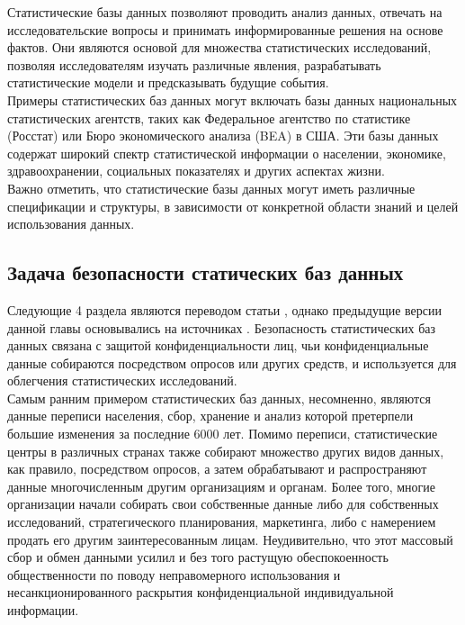Статистические базы данных позволяют проводить анализ данных, отвечать на исследовательские вопросы и принимать информированные решения на основе фактов. Они являются основой для множества статистических исследований, позволяя исследователям изучать различные явления, разрабатывать статистические модели и предсказывать будущие события.
\\

Примеры статистических баз данных могут включать базы данных национальных статистических агентств, таких как Федеральное агентство по статистике (Росстат) или Бюро экономического анализа (BEA) в США. Эти базы данных содержат широкий спектр статистической информации о населении, экономике, здравоохранении, социальных показателях и других аспектах жизни.
\\

Важно отметить, что статистические базы данных могут иметь различные спецификации и структуры, в зависимости от конкретной области знаний и целей использования данных.

\subsection{Задача безопасности статических баз данных}
Следующие 4 раздела являются переводом статьи \cite{brankovic2007statistical}, однако предыдущие версии данной главы основывались на источниках \cite{SDB1989, IntroBD2014, SDB1999, LatticeModel}.
Безопасность статистических баз данных связана с защитой конфиденциальности лиц, чьи конфиденциальные данные собираются посредством опросов или других средств, и
используется для облегчения статистических исследований. 
\\

Самым ранним примером статистических баз данных, несомненно, являются данные переписи населения,
сбор, хранение и анализ которой претерпели большие изменения
за последние 6000 лет. Помимо переписи, статистические центры 
в различных странах также собирают множество других видов данных, как правило, посредством опросов, а затем обрабатывают и распространяют данные многочисленным другим организациям и органам. Более того, многие организации начали собирать свои собственные данные либо для собственных исследований, стратегического планирования, маркетинга, либо с намерением продать его другим заинтересованным лицам. Неудивительно, что этот массовый сбор и обмен данными усилил и без того растущую обеспокоенность общественности по поводу неправомерного использования и несанкционированного раскрытия конфиденциальной индивидуальной информации.
\\

